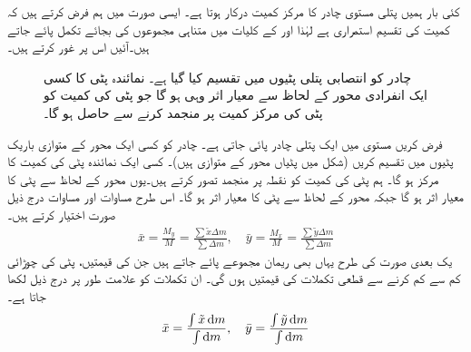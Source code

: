 کئی بار ہمیں پتلی مستوی چادر کا مرکز کمیت درکار ہوتا ہے۔ ایسی صورت میں ہم فرض کرتے ہیں کہ کمیت کی تقسیم استمراری ہے لہٰذا  اور  کے کلیات میں متناہی مجموعوں کی بجائے تکمل پائے جاتے ہیں۔آئیں اس پر غور کرتے ہیں۔
\begin{figure}
\centering
{}
\caption{چادر کو انتصابی پتلی پٹیوں میں تقسیم کیا گیا ہے۔ نمائندہ پٹی کا کسی ایک انفرادی محور کے لحاظ سے معیار اثر وہی ہو گا جو پٹی کی کمیت  کو پٹی کی مرکز کمیت پر منجمد کرنے سے حاصل ہو گا۔}
\label{شکل_تکمل_استعمال_چادر_انتصابی_پٹی_مرکز_کمیت}
\end{figure}
فرض کریں  مستوی میں ایک پتلی چادر پائی جاتی ہے۔ چادر کو کسی ایک محور کے متوازی باریک پٹیوں میں تقسیم کریں (شکل  میں پٹیاں محور  کے متوازی ہیں)۔ کسی ایک نمائندہ پٹی کی کمیت کا مرکز  ہو گا۔ ہم پٹی کی کمیت  کو نقطہ  پر منجمد تصور کرتے ہیں۔یوں محور  کے لحاظ سے پٹی کا معیار اثر  ہو گا جبکہ محور  کے لحاظ سے پٹی کا معیار اثر  ہو گا۔ اس طرح مساوات  اور مساوات  درج ذیل صورت اختیار کرتے ہیں۔
\begin{align*}
\bar{x}=\frac{M_y}{M}=\frac{\sum \tilde{x}\Delta m}{\sum \Delta m},\quad \bar{y}=\frac{M_x}{M}=\frac{\sum \tilde{y}\Delta m}{\sum \Delta m}
\end{align*}
یک بعدی صورت کی طرح یہاں بھی ریمان مجموعے پائے جاتے ہیں جن کی قیمتیں، پٹی کی چوڑائی کم سے کم کرنے سے قطعی تکملات کی قیمتیں ہوں گی۔ ان تکملات کو علامت طور پر درج ذیل لکھا جاتا ہے۔
\begin{align*}
\bar{x}=\frac{\int \tilde{x}\dif m}{\int \dif m},\quad \bar{y}=\frac{\int\tilde{y}\dif m}{\int\dif m}
\end{align*} 

